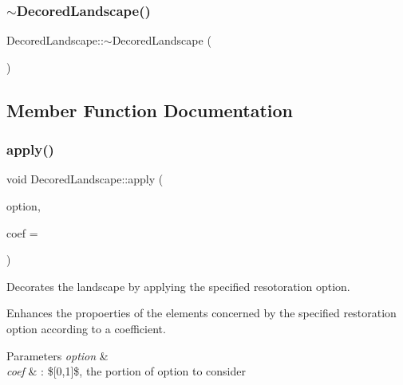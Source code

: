 \mbox{\label{class_decored_landscape_a5fcaa5685a1296f29b382fcde0f6ee0e}} 
\subsubsection{\texorpdfstring{$\sim$\+Decored\+Landscape()}{~DecoredLandscape()}}
{\footnotesize\ttfamily Decored\+Landscape\+::$\sim$\+Decored\+Landscape (\begin{DoxyParamCaption}{ }\end{DoxyParamCaption})}



\subsection{Member Function Documentation}
\mbox{\label{class_decored_landscape_a4613b09e1b8d817095dd486f9c1224b8}} 
\subsubsection{\texorpdfstring{apply()}{apply()}}
{\footnotesize\ttfamily void Decored\+Landscape\+::apply (\begin{DoxyParamCaption}\item[{const \hyperlink{class_restoration_plan_1_1_option}{Restoration\+Plan\+::\+Option} $\ast$}]{option,  }\item[{double}]{coef = {} }\end{DoxyParamCaption})}



Decorates the landscape by applying the specified resotoration option. 

Enhances the propoerties of the elements concerned by the specified restoration option according to a coefficient.


\begin{DoxyParams}{Parameters}
{\em option} & \\
\hline
{\em coef} & \+: \$\mbox{[}0,1\mbox{]}\$, the portion of option to consider \\
\hline
\end{DoxyParams}
\mbox{\label{class_decored_landscape_a45685d1bf37d032f1793f885eaf4e80c}} 
